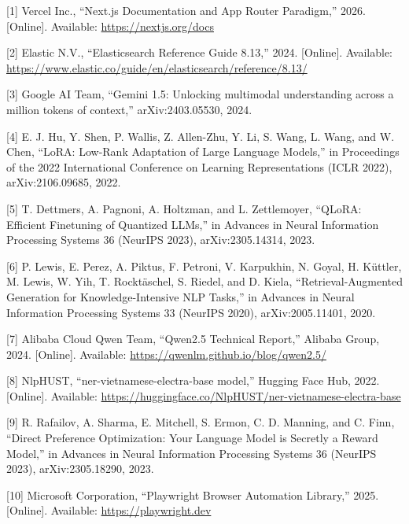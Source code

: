 \documentclass[12pt, a4paper]{report}
\renewcommand{\textit}[1]{\textup{#1}}
\begin{document}
{
\setlength{\parindent}{0pt}
\setlength{\parskip}{0.1cm}

\hypertarget{cite1}{}[1] Vercel Inc., ``Next.js Documentation and App Router Paradigm,'' 2026. [Online]. Available: \url{https://nextjs.org/docs}

\hypertarget{cite2}{}[2] Elastic N.V., ``Elasticsearch Reference Guide 8.13,'' 2024. [Online]. Available: \url{https://www.elastic.co/guide/en/elasticsearch/reference/8.13/}

\hypertarget{cite3}{}[3] Google AI Team, ``Gemini 1.5: Unlocking multimodal understanding across a million tokens of context,'' \textit{arXiv:2403.05530}, 2024.

\hypertarget{cite4}{}[4] E. J. Hu, Y. Shen, P. Wallis, Z. Allen-Zhu, Y. Li, S. Wang, L. Wang, and W. Chen, ``LoRA: Low-Rank Adaptation of Large Language Models,'' in \textit{Proceedings of the 2022 International Conference on Learning Representations (ICLR 2022)}, \textit{arXiv:2106.09685}, 2022.

\hypertarget{cite5}{}[5] T. Dettmers, A. Pagnoni, A. Holtzman, and L. Zettlemoyer, ``QLoRA: Efficient Finetuning of Quantized LLMs,'' in \textit{Advances in Neural Information Processing Systems 36 (NeurIPS 2023)}, \textit{arXiv:2305.14314}, 2023.

\hypertarget{cite6}{}[6] P. Lewis, E. Perez, A. Piktus, F. Petroni, V. Karpukhin, N. Goyal, H. Küttler, M. Lewis, W. Yih, T. Rocktäschel, S. Riedel, and D. Kiela, ``Retrieval-Augmented Generation for Knowledge-Intensive NLP Tasks,'' in \textit{Advances in Neural Information Processing Systems 33 (NeurIPS 2020)}, \textit{arXiv:2005.11401}, 2020.

\hypertarget{cite7}{}[7] Alibaba Cloud Qwen Team, ``Qwen2.5 Technical Report,'' Alibaba Group, 2024. [Online]. Available: \url{https://qwenlm.github.io/blog/qwen2.5/}

\hypertarget{cite8}{}[8] NlpHUST, ``ner-vietnamese-electra-base model,'' Hugging Face Hub, 2022. [Online]. Available: \url{https://huggingface.co/NlpHUST/ner-vietnamese-electra-base}

\hypertarget{cite9}{}[9] R. Rafailov, A. Sharma, E. Mitchell, S. Ermon, C. D. Manning, and C. Finn, ``Direct Preference Optimization: Your Language Model is Secretly a Reward Model,'' in \textit{Advances in Neural Information Processing Systems 36 (NeurIPS 2023)}, \textit{arXiv:2305.18290}, 2023.

\hypertarget{cite10}{}[10] Microsoft Corporation, ``Playwright Browser Automation Library,'' 2025. [Online]. Available: \url{https://playwright.dev}

}
\end{document}
